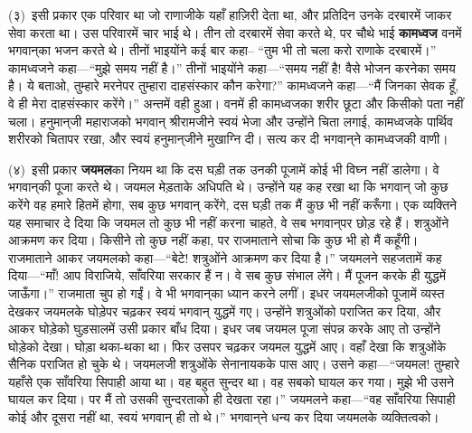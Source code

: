 \begin{sloppypar}\justifying{}
(३)~इसी प्रकार एक परिवार था जो राणाजीके यहाँ हाज़िरी देता था, और प्रतिदिन उनके दरबारमें जाकर सेवा करता था। उस परिवारमें चार भाई थे। तीन तो दरबारमें सेवा करते थे, पर चौथे भाई \textbf{कामध्वज} वनमें भगवान्‌का भजन करते थे। तीनों भाइयोंने कई बार कहा– “तुम भी तो चला करो राणाके दरबारमें।” कामध्वजने कहा—“मुझे समय नहीं है।” तीनों भाइयोंने कहा—“समय नहीं है! वैसे भोजन करनेका समय है। ये बताओ, तुम्हारे मरनेपर तुम्हारा दाह\-संस्कार कौन करेगा?” कामध्वजने कहा—“मैं जिनका सेवक हूँ, वे ही मेरा दाह\-संस्कार करेंगे।” अन्तमें वही हुआ। वनमें ही कामध्वजका शरीर छूटा और किसीको पता नहीं चला। हनुमान्‌जी महाराजको भगवान् श्रीरामजीने स्वयं भेजा और उन्होंने चिता लगाई, कामध्वजके पार्थिव शरीरको चितापर रखा, और स्वयं हनुमान्‌जीने मुखाग्नि दी। सत्य कर दी भगवान्‌ने कामध्वजकी वाणी।
\end{sloppypar}
\begin{sloppypar}\justifying{}
(४)~इसी प्रकार \textbf{जयमल}का नियम था कि दस घड़ी तक उनकी पूजामें कोई भी विघ्न नहीं डालेगा। वे भगवान्‌‍की पूजा करते थे। जयमल मेड़ताके अधिपति थे। उन्होंने यह कह रखा था कि भगवान् जो कुछ करेंगे वह हमारे हितमें होगा, सब कुछ भगवान् करेंगे, दस घड़ी तक मैं कुछ भी नहीं करूँगा। एक व्यक्तिने यह समाचार दे दिया कि जयमल तो कुछ भी नहीं करना चाहते, वे सब भगवान्‌‍पर छोड़ रहे हैं। शत्रुओंने आक्रमण कर दिया। किसीने तो कुछ नहीं कहा, पर राजमाताने सोचा कि कुछ भी हो मैं कहूँगी। राजमाताने आकर जयमलको कहा—“बेटे! शत्रुओंने आक्रमण कर दिया है।” जयमलने सहजतामें कह दिया—“माँ! आप विराजिये, साँवरिया सरकार हैं न। वे सब कुछ संभाल लेंगे। मैं पूजन करके ही युद्धमें जाऊँगा।” राजमाता चुप हो गईं। वे भी भगवान्‌का ध्यान करने लगीं। इधर जयमलजीको पूजामें व्यस्त देखकर जयमलके घोड़ेपर चढ़कर स्वयं भगवान् युद्धमें गए। उन्होंने शत्रुओंको पराजित कर दिया, और आकर घोड़ेको घुड़सालमें उसी प्रकार बाँध दिया। इधर जब जयमल पूजा संपन्न करके आए तो उन्होंने घोड़ेको देखा। घोड़ा थका-थका था। फिर उसपर चढ़कर जयमल युद्धमें आए। वहाँ देखा कि शत्रुओंके सैनिक पराजित हो चुके थे। जयमलजी शत्रुओंके सेनानायकके पास आए। उसने कहा—“जयमल! तुम्हारे यहाँसे एक साँवरिया सिपाही आया था। वह बहुत सुन्दर था। वह सबको घायल कर गया। मुझे भी उसने घायल कर दिया। पर मैं तो उसकी सुन्दरताको ही देखता रहा।” जयमलने कहा—“वह साँवरिया सिपाही कोई और दूसरा नहीं था, स्वयं भगवान् ही तो थे।” भगवान्‌‍ने धन्य कर दिया जयमलके व्यक्तित्वको।
\end{sloppypar}
